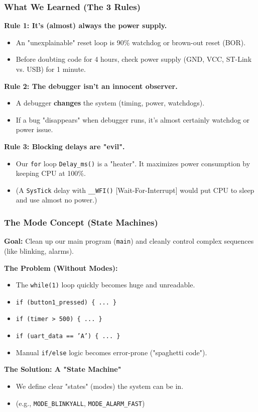 \documentclass{beamer}
\begin{document}
\begin{frame}
	\frametitle{What We Learned (The 3 Rules)}
	\textbf{Rule 1: It's (almost) always the power supply.}
	\begin{itemize}
		\item An "unexplainable" reset loop is 90\% watchdog
		or brown-out reset (BOR).
		\item Before doubting code for 4 hours, check power supply
		(GND, VCC, ST-Link vs. USB) for 1 minute.
	\end{itemize}
	\bigskip
	\textbf{Rule 2: The debugger isn't an innocent observer.}
	\begin{itemize}
		\item A debugger \textbf{changes} the system (timing, power, watchdogs).
		\item If a bug "disappears" when debugger runs,
		it's almost certainly watchdog or power issue.
	\end{itemize}
	\bigskip
	\textbf{Rule 3: Blocking delays are "evil".}
	\begin{itemize}
		\item Our \texttt{for} loop \texttt{Delay\_ms()} is a "heater".
		It maximizes power consumption by keeping CPU at 100\%.
		\item (A \texttt{SysTick} delay with \texttt{\_\_WFI()} [Wait-For-Interrupt]
		would put CPU to sleep and use almost no power.)
	\end{itemize}
\end{frame}
\begin{frame}
	\frametitle{The Mode Concept (State Machines)}
	\textbf{Goal:} Clean up our main program (\texttt{main})
	and cleanly control complex sequences (like blinking, alarms).
	
	\bigskip
	\textbf{The Problem (Without Modes):}
	\begin{itemize}
		\item The \texttt{while(1)} loop quickly becomes huge and unreadable.
		\item \texttt{if (button1\_pressed) \{ ... \}}
		\item \texttt{if (timer > 500) \{ ... \}}
		\item \texttt{if (uart\_data == 'A') \{ ... \}}
		\item Manual \texttt{if/else} logic becomes error-prone ("spaghetti code").
	\end{itemize}
	
	\bigskip
	\textbf{The Solution: A "State Machine"}
	\begin{itemize}
		\item We define clear "states" (modes) the system can be in.
		\item (e.g., \texttt{MODE\_BLINKYALL}, \texttt{MODE\_ALARM\_FAST})
	\end{itemize}
\end{frame}
\end{document}
